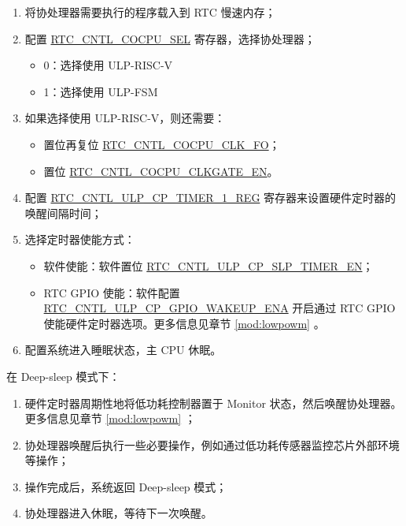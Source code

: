\documentclass[main\_\_CN.tex]{subfiles}
\begin{document}
\begin{enumerate}
    \item 将协处理器需要执行的程序载入到 RTC 慢速内存；
    \item 配置 \hyperref[fielddesc:RTCCNTLCOCPUSEL]{RTC\_CNTL\_COCPU\_SEL} 寄存器，选择协处理器；
    \begin{itemize}
        \item 0：选择使用 ULP-RISC-V
        \item 1：选择使用 ULP-FSM
    \end{itemize}
    \item 如果选择使用 ULP-RISC-V，则还需要：        \begin{itemize}
        \item 置位再复位 \hyperref[fielddesc:RTCCNTLCOCPUCLKFO]{RTC\_CNTL\_COCPU\_CLK\_FO}；
        \item 置位 \hyperref[fielddesc:RTCCNTLCOCPUCLKGATEEN]{RTC\_CNTL\_COCPU\_CLKGATE\_EN}。
    \end{itemize}

    \item 配置 \hyperref[regdesc:RTCCNTLULPCPTIMER1REG]{RTC\_CNTL\_ULP\_CP\_TIMER\_1\_REG} 寄存器来设置硬件定时器的唤醒间隔时间；
    \item 选择定时器使能方式：
        \begin{itemize}
            \item 软件使能：软件置位 \hyperref[fielddesc:RTCCNTLULPCPSLPTIMEREN]{RTC\_CNTL\_ULP\_CP\_SLP\_TIMER\_EN}；
        \item RTC GPIO 使能：软件配置 \hyperref[fielddesc:RTCCNTLULPCPGPIOWAKEUPENA]{RTC\_CNTL\_ULP\_CP\_GPIO\_WAKEUP\_ENA} 开启通过 RTC GPIO 使能硬件定时器选项。更多信息见章节 \ref{mod:lowpowm} \textit{}。
        \end{itemize}
    \item 配置系统进入睡眠状态，主 CPU 休眠。
\end{enumerate}

在 Deep-sleep 模式下：

\begin{enumerate}
   \item 硬件定时器周期性地将低功耗控制器置于 Monitor 状态，然后唤醒协处理器。更多信息见章节 \ref{mod:lowpowm} \textit{}；
   \item 协处理器唤醒后执行一些必要操作，例如通过低功耗传感器监控芯片外部环境等操作；
   \item 操作完成后，系统返回 Deep-sleep 模式；
   \item 协处理器进入休眠，等待下一次唤醒。
\end{enumerate}
\end{document}
